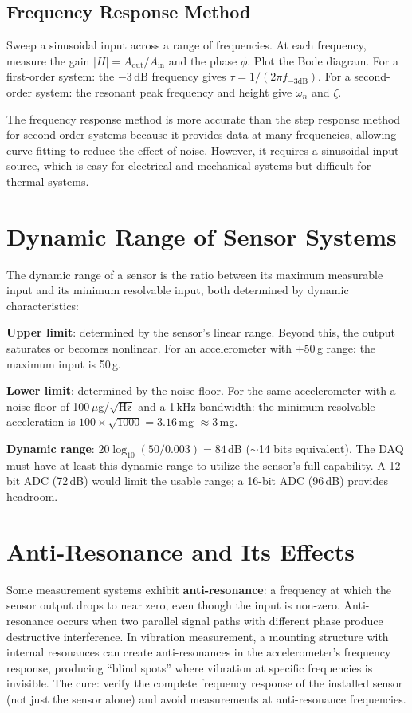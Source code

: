 \documentclass[11pt,letterpaper,twoside,openany]{book}
\begin{document}
\subsection{Frequency Response Method}
Sweep a sinusoidal input across a range of frequencies. At each frequency, measure the gain $|H| = A_{\text{out}}/A_{\text{in}}$ and the phase $\phi$. Plot the Bode diagram. For a first-order system: the $-3$\,dB frequency gives $\tau = 1/(2\pi f_{-3\text{dB}})$. For a second-order system: the resonant peak frequency and height give $\omega_n$ and $\zeta$.

The frequency response method is more accurate than the step response method for second-order systems because it provides data at many frequencies, allowing curve fitting to reduce the effect of noise. However, it requires a sinusoidal input source, which is easy for electrical and mechanical systems but difficult for thermal systems.

\section{Dynamic Range of Sensor Systems}
The dynamic range of a sensor is the ratio between its maximum measurable input and its minimum resolvable input, both determined by dynamic characteristics:

\textbf{Upper limit}: determined by the sensor's linear range. Beyond this, the output saturates or becomes nonlinear. For an accelerometer with $\pm$50\,g range: the maximum input is 50\,g.

\textbf{Lower limit}: determined by the noise floor. For the same accelerometer with a noise floor of 100\,$\mu$g/$\sqrt{\text{Hz}}$ and a 1\,kHz bandwidth: the minimum resolvable acceleration is $100 \times \sqrt{1000} = 3.16$\,mg $\approx 3$\,mg.

\textbf{Dynamic range}: $20\log_{10}(50/0.003) = 84$\,dB ($\sim$14 bits equivalent). The DAQ must have at least this dynamic range to utilize the sensor's full capability. A 12-bit ADC (72\,dB) would limit the usable range; a 16-bit ADC (96\,dB) provides headroom.

\section{Anti-Resonance and Its Effects}
Some measurement systems exhibit \textbf{anti-resonance}: a frequency at which the sensor output drops to near zero, even though the input is non-zero. Anti-resonance occurs when two parallel signal paths with different phase produce destructive interference. In vibration measurement, a mounting structure with internal resonances can create anti-resonances in the accelerometer's frequency response, producing ``blind spots'' where vibration at specific frequencies is invisible. The cure: verify the complete frequency response of the installed sensor (not just the sensor alone) and avoid measurements at anti-resonance frequencies.
\end{document}
